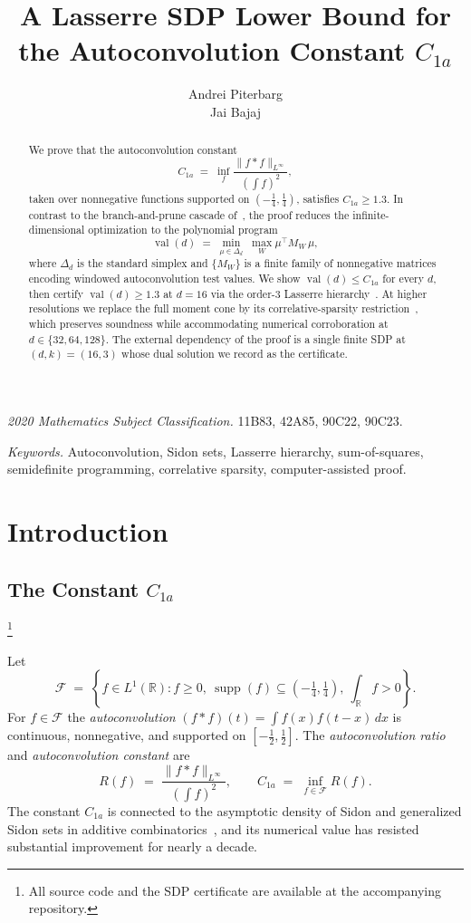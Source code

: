 \documentclass[11pt, letterpaper]{article}
\title{\texorpdfstring{%
  \bfseries A Lasserre SDP Lower Bound for the Autoconvolution Constant $C_{1a}$
}{A Lasserre SDP Lower Bound for the Autoconvolution Constant C1a}}
\author{Andrei Piterbarg \\ Jai Bajaj}
\date{}
\theoremstyle{paperplain}
\theoremstyle{paperdef}
\newcommand{\R}{\mathbb{R}}
\newcommand{\supp}{\operatorname{supp}}
\newcommand{\val}{\operatorname{val}}
\begin{document}
\maketitle

\begin{abstract}
We prove that the autoconvolution constant
\[
  C_{1a}
  \;=\;
  \inf_f \frac{\|f*f\|_{L^\infty}}{\left(\int f\right)^2},
\]
taken over nonnegative functions supported on $(-\tfrac14,\tfrac14)$,
satisfies $C_{1a}\ge 1.3$.  In contrast to the branch-and-prune
cascade of~\cite{BajajCS2026}, the proof reduces the infinite-dimensional
optimization to the polynomial program
\[
  \val(d)
  \;=\;
  \min_{\mu \in \Delta_d}\;\max_W \mu^\top M_W\,\mu,
\]
where $\Delta_d$ is the standard simplex and $\{M_W\}$ is a finite
family of nonnegative matrices encoding windowed autoconvolution test
values.  We show $\val(d) \le C_{1a}$ for every $d$, then certify
$\val(d)\ge 1.3$ at $d=16$ via the order-$3$ Lasserre
hierarchy~\cite{Lasserre2001}.  At higher resolutions we replace
the full moment cone by its correlative-sparsity
restriction~\cite{Waki2006}, which preserves soundness while
accommodating numerical corroboration at $d\in\{32,64,128\}$.  The
external dependency of the proof is a single finite SDP at
$(d,k)=(16,3)$ whose dual solution we record as the certificate.
\end{abstract}
\noindent\textit{2020 Mathematics Subject Classification.}
11B83, 42A85, 90C22, 90C23.

\smallskip

\noindent\textit{Keywords.}
Autoconvolution, Sidon sets, Lasserre hierarchy, sum-of-squares,
semidefinite programming, correlative sparsity, computer-assisted
proof.

\medskip

\section{Introduction}\label{sec:intro}

\subsection{The Constant \texorpdfstring{$C_{1a}$}{C1a}}\footnote{All
  source code and the SDP certificate are available at the accompanying
  repository.}

Let
\[
  \mathcal{F}
  \;=\;
  \left\{
    f \in L^1(\R) :
    f \ge 0,\
    \supp(f) \subseteq \left(-\tfrac14,\tfrac14\right),\
    \int_{\R} f > 0
  \right\}.
\]
For $f\in\mathcal{F}$ the \emph{autoconvolution} $(f*f)(t) =
\int f(x)f(t-x)\,dx$ is continuous, nonnegative, and supported on
$[-\tfrac12,\tfrac12]$.  The \emph{autoconvolution ratio} and
\emph{autoconvolution constant} are
\[
  R(f) \;=\; \frac{\|f*f\|_{L^\infty}}{\left(\int f\right)^2},
  \qquad
  C_{1a} \;=\; \inf_{f \in \mathcal{F}} R(f).
\]
The constant $C_{1a}$ is connected to the asymptotic density of Sidon
and generalized Sidon sets in additive
combinatorics~\cite{ET41,MO2006,CRV10,MO2009,CS17}, and its numerical
value has resisted substantial improvement for nearly a decade.
\end{document}
